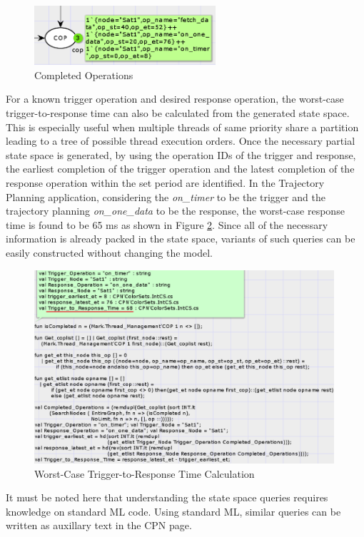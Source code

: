 \begin{figure}[ht]
\centering
\includegraphics[width=0.60\textwidth]{./figs/cpn_completed_operations}
\caption{Completed Operations}
\label{fig:cpn_completed_operations}
\vspace{-0.2in}
\end{figure}
\vspace{0.1in}

For a known trigger operation and desired response operation, the worst-case trigger-to-response time can also be calculated from the generated state space. This is especially useful when multiple threads of same priority share a partition leading to a tree of possible thread execution orders. Once the necessary partial state space is generated, by using the operation IDs of the trigger and response, the earliest completion of the trigger operation and the latest completion of the response operation within the set period are identified. In the Trajectory Planning application, considering the \emph{on\_timer} to be the trigger and the trajectory planning \emph{on\_one\_data} to be the response, the worst-case response time is found to be 65 ms as shown in Figure \ref{fig:cpn_tpa_trigger_response_time}. Since all of the necessary information is already packed in the state space, variants of such queries can be easily constructed without changing the model.

\begin{figure}[ht]
\centering
\includegraphics[width=0.99\textwidth]{./figs/cpn_tpa_trigger_response_time}
\caption{Worst-Case Trigger-to-Response Time Calculation}
\label{fig:cpn_tpa_trigger_response_time}
\vspace{-0.2in}
\end{figure}
\vspace{0.1in}

It must be noted here that understanding the state space queries requires knowledge on standard ML code. Using standard ML, similar queries can be written as auxillary text in the CPN page. 
